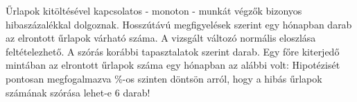 Űrlapok kitöltésével kapcsolatos - monoton - munkát végzők bizonyos
hibaszázalékkal dolgoznak. Hosszútávú megfigyelések szerint egy 
 hónapban  darab az elrontott űrlapok várható száma. 
 A vizsgált változó normális eloszlása feltételezhető. 
 A szórás korábbi tapasztalatok szerint  darab. Egy  
főre kiterjedő mintában az elrontott űrlapok száma egy hónapban az 
alábbi volt:
Hipotézisét pontosan megfogalmazva \%-os szinten döntsön arról, 
hogy a hibás űrlapok számának szórása lehet-e 6 darab!